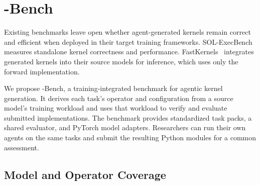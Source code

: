 \section{\system-Bench}
\label{sec:workloads}

 

Existing benchmarks leave open whether agent-generated kernels remain correct and efficient when deployed in their target training frameworks. SOL-ExecBench~\cite{execbench} measures standalone kernel correctness and performance. FastKernels~\cite{oliaro2026fastkernels} integrates generated kernels into their source models for inference, which uses only the forward implementation.

We propose \system-Bench, a training-integrated benchmark for agentic kernel generation. It derives each task's operator and configuration from a source model's training workload and uses that workload to verify and evaluate submitted implementations. The benchmark provides standardized task packs, a shared evaluator, and PyTorch model adapters. Researchers can run their own agents on the same tasks and submit the resulting Python modules for a common assessment.

\subsection{Model and Operator Coverage}
\label{sec:workload_composition}


